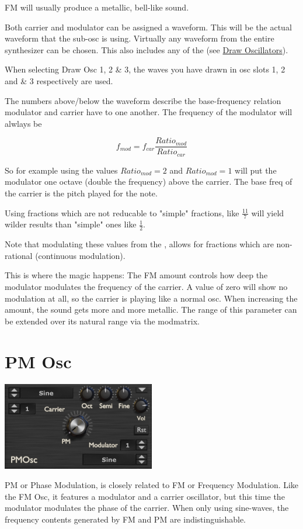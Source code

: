 FM will usually produce a metallic, bell-like sound.

{Both carrier and modulator can be assigned a waveform. This will be the actual waveform that the sub-osc is using. Virtually any waveform from the entire synthesizer can be chosen. This also includes any of the (see \hyperref[wavedraw]{Draw Oscillators}).

When selecting  Draw Osc 1, 2 \& 3, the waves you have drawn in osc slots 1, 2 and \& 3 respectively are used.}

{The numbers above/below the waveform describe the base-frequency relation modulator and carrier have to one another. The frequency of the modulator will alwlays be

\begin{equation}
    f_{mod} = f_{car} \frac{Ratio_{mod}}{Ratio_{car}}
\end{equation}

So for example using the values $Ratio_{mod} = 2$ and $Ratio_{mod} = 1$ will put the modulator one octave (double the frequency) above the carrier. The base freq of the carrier is the pitch played for the note.

Using fractions which are not reducable to "simple" fractions, like $\frac{11}{7}$ will yield wilder results than "simple" ones like $\frac{1}{2}$.

Note that modulating these values from the \modmatrix, allows for fractions which are non-rational (continuous modulation).}

{This is where the magic happens: The FM amount controls how deep the modulator modulates the frequency of the carrier. A value of zero will show no modulation at all, so the carrier is playing like a normal osc. When increasing the amount, the sound gets more and more metallic. The range of this parameter can be extended over its natural range via the modmatrix.}

\section{PM Osc}
\begin{center}
    \includegraphics[width=0.5\textwidth]{graphics/pm_osc.png}
\end{center}
PM or Phase Modulation, is closely related to FM or Frequency Modulation. Like the FM Osc, it features a modulator and a carrier oscillator, but this time the modulator modulates the phase of the carrier. When only using sine-waves, the frequency contents generated by FM and PM are indistinguishable.

